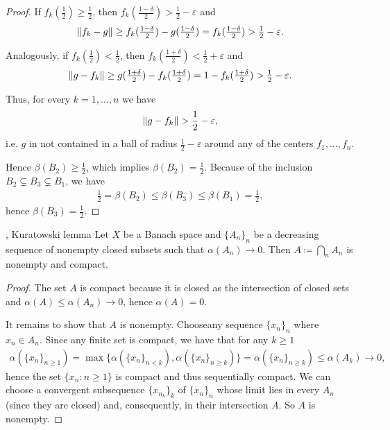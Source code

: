 \begin{proof}
  If $f_k(\tfrac 1 2) \geq \frac 1 2$, then $f_k(\tfrac {1 - \delta} 2) > \tfrac 1 2 - \varepsilon$ and
  \begin{align*}
    \left\Vert f_k - g \right\Vert \geq f_k(\tfrac {1 - \delta} 2) - g(\tfrac {1 - \delta} 2) = f_k(\tfrac {1 - \delta} 2) > \tfrac 1 2 - \varepsilon.
  \end{align*}

  Analogously, if $f_k(\tfrac 1 2) < \frac 1 2$, then $f_k(\tfrac {1 + \delta} 2) < \tfrac 1 2 + \varepsilon$ and
  \begin{align*}
    \left\Vert g - f_k \right\Vert \geq g(\tfrac {1 + \delta} 2) - f_k(\tfrac {1 + \delta} 2) = 1 - f_k(\tfrac {1 + \delta} 2) > \tfrac 1 2 - \varepsilon.
  \end{align*}

  Thus, for every $k = 1, \ldots, n$ we have
  \begin{align*}
    \left\Vert g - f_k \right\Vert > \frac 1 2 - \varepsilon,
  \end{align*}
  i.e. $g$ in not contained in a ball of radius $\frac 1 2 - \varepsilon$ around any of the centers $f_1, \ldots, f_n$.

  Hence $\beta(B_2) \geq \frac 1 2$, which implies $\beta(B_2) = \frac 1 2$. Because of the inclusion $B_2 \subsetneq B_3 \subsetneq B_1$, we have
  \begin{align*}
    \frac 1 2 = \beta(B_2) \leq \beta(B_3) \leq \beta(B_1) = \frac 1 2,
  \end{align*}
  hence $\beta(B_3) = \frac 1 2$.
\end{proof}

\begin{theorem}\label{thm:noncompact_kuratowski_lemma}\cite[exercise 7.4]{Deimling1985}, Kuratowski lemma
  Let $X$ be a Banach space and $\{ A_n \}_n$ be a decreasing sequence of nonempty closed subsets such that $\alpha(A_n) \to 0$. Then $A \coloneqq \bigcap_n A_n$ is nonempty and compact.
\end{theorem}
\begin{proof}
  The set $A$ is compact because it is closed as the intersection of closed sets and $\alpha(A) \leq \alpha(A_n) \to 0$, hence $\alpha(A) = 0$.

  It remains to show that $A$ is nonempty.
  Choose\AOC any sequence $\{ x_n \}_n$ where $x_n \in A_n$. Since any finite set is compact, we have that for any $k \geq 1$
  \begin{align*}
    \alpha(\{ x_n \}_{n \geq 1})
    =
    \max\{ \alpha(\{ x_n \}_{n < k}), \alpha(\{ x_n \}_{n \geq k}) \}
    =
    \alpha(\{ x_n \}_{n \geq k})
    \leq
    \alpha(A_k) \to 0,
  \end{align*}
  hence the set $\{ x_n \colon n \geq 1 \}$ is compact and thus sequentially compact. We can choose a convergent subsequence $\{ x_{n_k} \}_k$ of $\{ x_n \}_n$ whose limit lies in every $A_n$ (since they are closed) and, consequently, in their intersection $A$. So $A$ is nonempty.
\end{proof}
